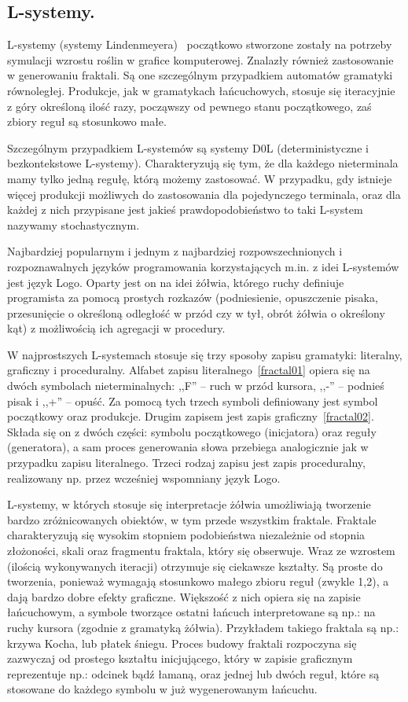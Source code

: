 \subsection{L-systemy.}
L-systemy (systemy Lindenmeyera)~\cite{lindenmeyer} początkowo stworzone zostały
na potrzeby symulacji wzrostu roślin w grafice komputerowej. Znalazły również zastosowanie w
generowaniu fraktali. Są one szczególnym przypadkiem automatów gramatyki
równoległej. Produkcje, jak w gramatykach łańcuchowych, stosuje się iteracyjnie
z góry określoną ilość razy, począwszy od pewnego stanu początkowego, zaś zbiory
reguł są stosunkowo małe.

Szczególnym przypadkiem L-systemów są systemy D0L (deterministyczne i
bezkontekstowe L-systemy). Charakteryzują się tym, że dla każdego nieterminala
mamy tylko jedną regułę, którą możemy zastosować. W przypadku, gdy istnieje
więcej produkcji możliwych do zastosowania dla pojedynczego terminala, oraz dla
każdej z nich przypisane jest jakieś prawdopodobieństwo to taki L-system
nazywamy stochastycznym.

Najbardziej popularnym i jednym z najbardziej rozpowszechnionych i
rozpoznawalnych języków programowania korzystających m.in. z idei L-systemów
jest język Logo. Oparty jest on na idei żółwia, którego ruchy definiuje
programista za pomocą prostych rozkazów (podniesienie, opuszczenie pisaka,
przesunięcie o określoną odległość w przód czy w tył, obrót żółwia o określony
kąt) z możliwością ich agregacji w procedury.

W najprostszych L-systemach stosuje się trzy sposoby zapisu gramatyki:
literalny, graficzny i proceduralny. Alfabet zapisu literalnego~\ref{fractal01}
opiera się na dwóch symbolach nieterminalnych: ,,F'' -- ruch w przód kursora,
,,-'' -- podnieś pisak i ,,+'' -- opuść. Za pomocą tych trzech symboli
definiowany jest symbol początkowy oraz produkcje. Drugim zapisem jest zapis
graficzny~\ref{fractal02}. Składa się on z dwóch części: symbolu początkowego
(inicjatora) oraz reguły (generatora), a sam proces generowania słowa przebiega
analogicznie jak w przypadku zapisu literalnego. Trzeci rodzaj zapisu jest zapis
proceduralny, realizowany np. przez wcześniej wspomniany język Logo.

L-systemy, w których stosuje się interpretacje żółwia umożliwiają tworzenie
bardzo zróżnicowanych obiektów, w tym przede wszystkim fraktale. Fraktale
charakteryzują się wysokim stopniem podobieństwa niezależnie od stopnia
złożoności, skali oraz fragmentu fraktala, który się obserwuje. Wraz ze wzrostem
(ilością wykonywanych iteracji) otrzymuje się ciekawsze kształty. Są proste do
tworzenia, ponieważ wymagają stosunkowo małego zbioru reguł (zwykle 1,2), a dają
bardzo dobre efekty graficzne. Większość z nich opiera się na zapisie
łańcuchowym, a symbole tworzące ostatni łańcuch interpretowane są np.: na ruchy
kursora (zgodnie z gramatyką żółwia). Przykładem takiego fraktala są np.: krzywa
Kocha, lub płatek śniegu. Proces budowy fraktali rozpoczyna się zazwyczaj od
prostego kształtu inicjującego, który w zapisie graficznym reprezentuje np.:
odcinek bądź łamaną, oraz jednej lub dwóch reguł, które są stosowane do każdego
symbolu w już wygenerowanym łańcuchu.

